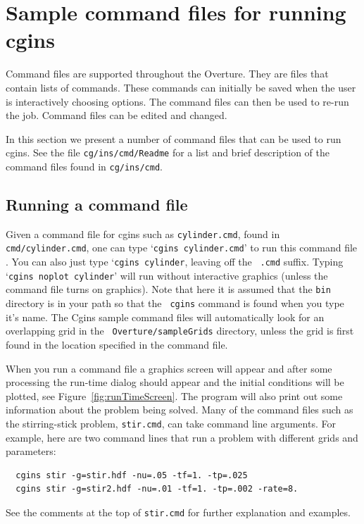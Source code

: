 \documentclass{article}
\newcommand{\Index}[1]{#1\index{#1}}
\begin{document}
\section{Sample command files for running cgins} \label{sec:demo}

Command files are supported throughout the Overture. They are files
that contain lists of commands. These commands can initially be saved
when the user is interactively choosing options.  The \Index{command files}
can then be used to re-run the job. Command files can be edited and
changed.

In this section we present a number of command files that can be used
to run cgins. See the file {\tt cg/ins/cmd/Readme} for a list and brief description of
the command files found in {\tt cg/ins/cmd}. 

\subsection{Running a command file}

Given a \Index{command file} for cgins such as {\tt cylinder.cmd}, found in {\tt
cmd/cylinder.cmd}, one can type `{\tt cgins cylinder.cmd}' to run this command
file . You can also just type `{\tt cgins cylinder}, leaving off the {\tt
.cmd} suffix. Typing `{\tt cgins noplot cylinder}' will run without
interactive graphics (unless the command file turns on graphics). Note that here
it is assumed that the {\tt bin} directory is in your path so that the {\tt
cgins} command is found when you type it's name. The Cgins sample
command files will automatically look for an overlapping grid in the {\tt
Overture/sampleGrids} directory, unless the grid is first found in the location
specified in the command file.

When you run a command file a graphics screen will appear and after some
processing the run-time dialog should appear and the initial conditions will be
plotted, see Figure~\ref{fig:runTimeScreen}. The program will also print out some information about the problem
being solved. 
Many of the command files such as the stirring-stick problem, {\tt stir.cmd},
can take command line arguments.  For example, here
are two command lines that run a problem with different grids and parameters:
\begin{verbatim}
  cgins stir -g=stir.hdf -nu=.05 -tf=1. -tp=.025 
  cgins stir -g=stir2.hdf -nu=.01 -tf=1. -tp=.002 -rate=8.
\end{verbatim}
See the comments at the top of {\tt stir.cmd} for further explanation and examples.
\end{document}
